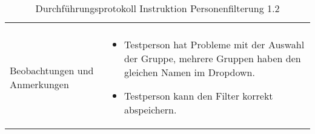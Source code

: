 \newpage

\begin{table}[h!]
   \begin{tabular}{|L{0.4\textwidth}|L{0.6\textwidth}|}
       \hline
        \\
       Beobachtungen und Anmerkungen & 
       \begin{itemize}
         \item Testperson hat Probleme mit der Auswahl der Gruppe, mehrere Gruppen haben den gleichen Namen im Dropdown.
         \item Testperson kann den Filter korrekt abspeichern.
       \end{itemize}   \\
       \hline
     \end{tabular}
     \caption{Durchführungsprotokoll Instruktion Personenfilterung 1.2}
\end{table}

\newpage

